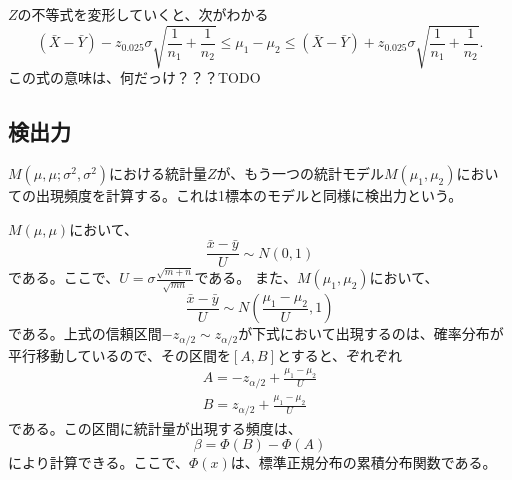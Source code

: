 $Z$の不等式を変形していくと、次がわかる
\begin{equation*}
    (\bar{X}-\bar{Y})-z_{0.025}\sigma\sqrt{\frac{1}{n_1}+\frac{1}{n_2}} \leq \mu_1-\mu_2 \leq (\bar{X}-\bar{Y})+z_{0.025}\sigma\sqrt{\frac{1}{n_1}+\frac{1}{n_2}}.
\end{equation*}
この式の意味は、何だっけ？？？TODO



\subsection{検出力}
$M(\mu,\mu;\sigma^2,\sigma^2)$における統計量$Z$が、もう一つの統計モデル$M(\mu_1,\mu_2)$においての出現頻度を計算する。これは1標本のモデルと同様に検出力という。

$M(\mu,\mu)$において、
\begin{equation*}
    \frac{\bar{x}-\bar{y}}{U} \sim N(0,1)
\end{equation*}
である。ここで、$U=\sigma\frac{\sqrt{m+n}}{\sqrt{mn}}$である。
また、$M(\mu_1,\mu_2)$において、
\begin{equation*}
    \frac{\bar{x}-\bar{y}}{U}\sim N(\frac{\mu_1-\mu_2}{U},1)
\end{equation*}
である。上式の信頼区間$-z_{\alpha/2}\sim z_{\alpha/2}$が下式において出現するのは、確率分布が平行移動しているので、その区間を$[A,B]$とすると、ぞれぞれ
\begin{eqnarray*}
    A = -z_{\alpha/2}+\frac{\mu_1-\mu_2}{U}\\
    B = z_{\alpha/2}+\frac{\mu_1-\mu_2}{U}
\end{eqnarray*}
である。この区間に統計量が出現する頻度は、
\begin{equation*}
    \beta = \varPhi(B)-\varPhi(A)
\end{equation*}
により計算できる。ここで、$\varPhi(x)$は、標準正規分布の累積分布関数である。

